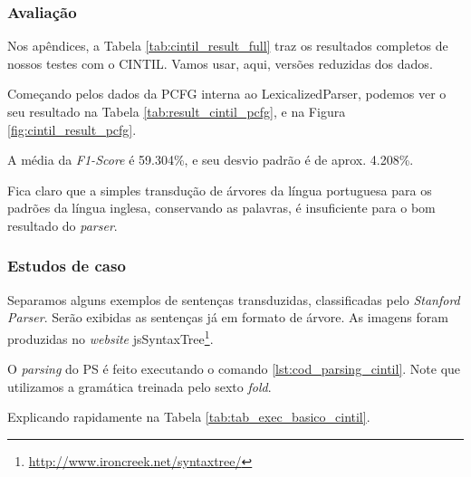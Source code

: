 \subsubsection{Avaliação} 
\label{subsubsec:result_aval_cintil}

Nos apêndices, a Tabela \ref{tab:cintil_result_full} traz os resultados completos de nossos testes com o CINTIL. Vamos usar, aqui, versões reduzidas dos dados.

Começando pelos dados da PCFG interna ao LexicalizedParser, podemos ver o seu resultado na Tabela \ref{tab:result_cintil_pcfg}, e na Figura \ref{fig:cintil_result_pcfg}.
\begin{center}
    
\end{center}

A média da \textit{F1-Score} é 59.304\%, e seu desvio padrão é de aprox. 4.208\%.

Fica claro que a simples transdução de árvores da língua portuguesa para os padrões da língua inglesa, conservando as palavras, é insuficiente para o bom resultado do \textit{parser}.

\begin{center}
    
\end{center}

\subsubsection{Estudos de caso}
\label{subsubsec:ec_cintil}

Separamos alguns exemplos de sentenças transduzidas, classificadas pelo \textit{Stanford Parser}. Serão exibidas as sentenças já em formato de árvore. As imagens foram produzidas no \textit{website} jsSyntaxTree\footnote{\url{http://www.ironcreek.net/syntaxtree/}}.

O \textit{parsing} do PS é feito executando o comando \ref{lst:cod_parsing_cintil}. Note que utilizamos a gramática treinada pelo sexto \textit{fold}.
\begin{center}
    
\end{center}

Explicando rapidamente na Tabela \ref{tab:tab_exec_basico_cintil}.

\begin{center}
    
\end{center}

